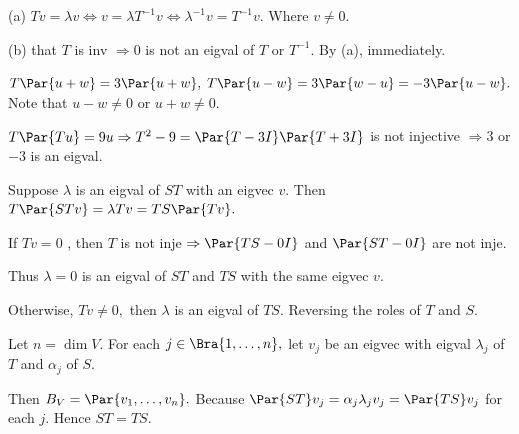 (a) $Tv=\lambda v\Longleftrightarrow v=\lambda T^{-1}v\Longleftrightarrow \lambda^{-1}v=T^{-1}v.$ Where $v\neq 0.$\vspace{2pt}\par
\Blind{\Solution} (b) \NOTICE that $T$ is inv $\Longrightarrow0$ is not an eigval of $T$ or $T^{-1}.$ By (a), immediately.\PfEnd
\SepLine

$T\Par{u+w}=3\Par{u+w},\;T\Par{u-w}=3\Par{w-u}=-3\Par{u-w}.$ Note that $u-w\neq 0$ or $u+w\neq 0.$\par
\Blind{\Solution} \Or $T\Par{Tu}=9u\Rightarrow T^2-9=\Par{T-3I}\Par{T+3I}$ is not injective $\Rightarrow 3$ or $-3$ is an eigval.\PfEnd
\SepLine

Suppose $\lambda$ is an eigval of $ST$ with an eigvec $v.$ Then $T\Par{STv}=\lambda Tv=TS\Par{Tv}.$\par
\Blind{\Solution} If $Tv=0$ , then $T$ is not inje $\Rightarrow\Par{TS-0I}$ and $\Par{ST-0I}$ are not inje.\par
\Blind{\Solution} Thus $\lambda=0$ is an eigval of $ST$ and $TS$ with the same eigvec $v.$\par
\Blind{\Solution} Otherwise, $Tv\neq 0,$ then $\lambda$ is an eigval of $TS.$ Reversing the roles of $T$ and $S.$\PfEnd
\SepLine

Let $n=\dim V.$ For each $j\in\Bra{1,\dots,n},$ let $v_j$ be an eigvec with eigval $\lambda_j$ of $T$ and $\alpha_j$ of $S$.\par
\Blind{\Solution} Then $B_V=\Par{v_1,\dots,v_n}.$ Because $\Par{ST}v_j=\alpha_j\lambda_j v_j=\Par{TS}v_j$ for each $j.$ Hence $ST=TS.$\PfEnd
\SepLine

